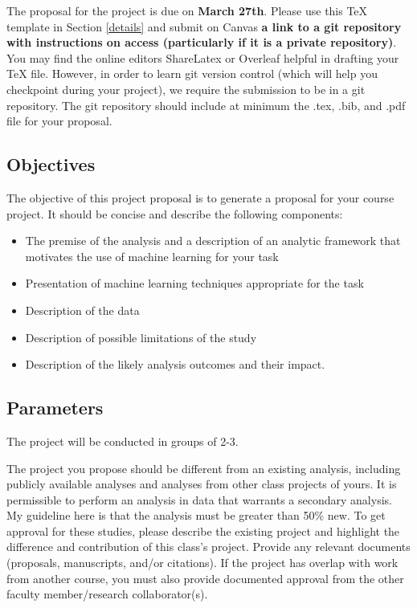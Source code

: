 \documentclass[twoside,11pt]{article}
\begin{document}
The proposal for the project is due on \textbf{March 27th}. Please use this TeX template in Section \ref{details} and submit on Canvas \textbf{a link to a git repository with instructions on access (particularly if it is a private repository)}. You may find the online editors ShareLatex or Overleaf helpful in drafting your TeX file. However, in order to learn git version control (which will help you checkpoint during your project), we require the submission to be in a git repository. The git repository should include at minimum the .tex, .bib, and .pdf file for your proposal.

\subsection{Objectives}
The objective of this project proposal is to generate a proposal for your course project. It should be concise and describe the following components:
\begin{itemize}
\item The premise of the analysis and a description of an analytic framework that motivates the use of machine learning for your task
\item Presentation of machine learning techniques appropriate for the task
\item Description of the data
\item Description of possible limitations of the study
\item Description of the likely analysis outcomes and their impact.
\end{itemize}

\subsection{Parameters}
The project will be conducted in groups of 2-3.

The project you propose should be different from an existing analysis, including publicly available analyses and analyses from other class projects of yours. It is permissible to perform an analysis in data that warrants a secondary analysis. My guideline here is that the analysis must be greater than 50\% new. To get approval for these studies, please describe the existing project and highlight the difference and contribution of this class's project. Provide any relevant documents (proposals, manuscripts, and/or citations). If the project has overlap with work from another course, you must also provide documented approval from the other faculty member/research collaborator(s). 
\end{document}

